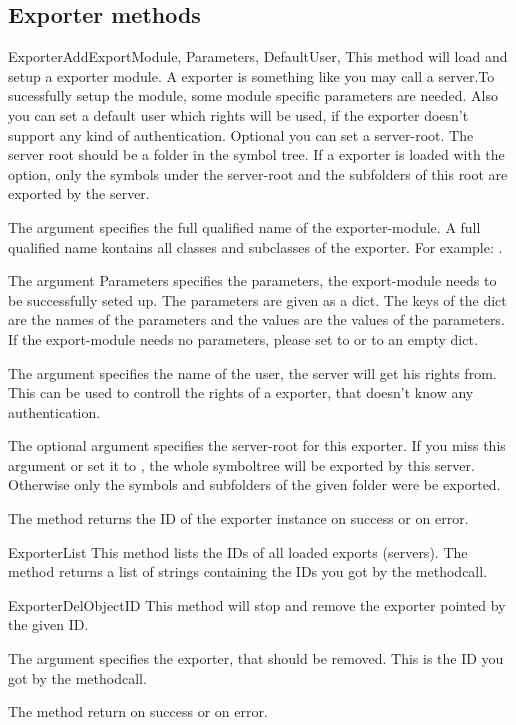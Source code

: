 \subsection{Exporter methods}
\begin{methoddesc}[Core]{ExporterAdd}{ExportModule, Parameters, DefaultUser, }
This method will load and setup a exporter module. A exporter is something like
you may call a server.To sucessfully setup the module, some module specific 
parameters are needed. Also you can set a default user which rights will be 
used, if the exporter doesn't support any kind of authentication. Optional you can set 
a server-root. The server root should be a folder in the symbol tree. If a exporter 
is loaded with the  option, only the symbols under the server-root 
and the subfolders of this root are exported by the server.

The argument  specifies the full qualified name of the 
exporter-module. A full qualified name kontains all classes and subclasses of 
the exporter. For example: . 

The argument Parameters specifies the parameters, the export-module needs to be
successfully seted up. The parameters are given as a dict. The keys of the dict
are the names of the parameters and the values are the values of the 
parameters. If the export-module needs no parameters, please set 
 to  or to an empty dict.

The argument  specifies the name of the user, the server will 
get his rights from. This can be used to controll the rights of a exporter,
that doesn't know any authentication.

The optional argument  specifies the server-root for this exporter. 
If you miss this argument or set it to , the whole symboltree
will be exported by this server. Otherwise only the symbols and subfolders of
the given folder were be exported.

The method returns the ID of the exporter instance on success or 
on error.
\end{methoddesc}


\begin{methoddesc}[Core]{ExporterList}{}
This method lists the IDs of all loaded exports (servers). The method returns
a list of strings containing the IDs you got by the 
methodcall. 
\end{methoddesc}


\begin{methoddesc}[Core]{ExporterDel}{ObjectID}
This method will stop and remove the exporter pointed by the given ID. 

The argument  specifies the exporter, that should be removed.
This is the ID you got by the  methodcall.

The method return  on success or  on error.
\end{methoddesc}
